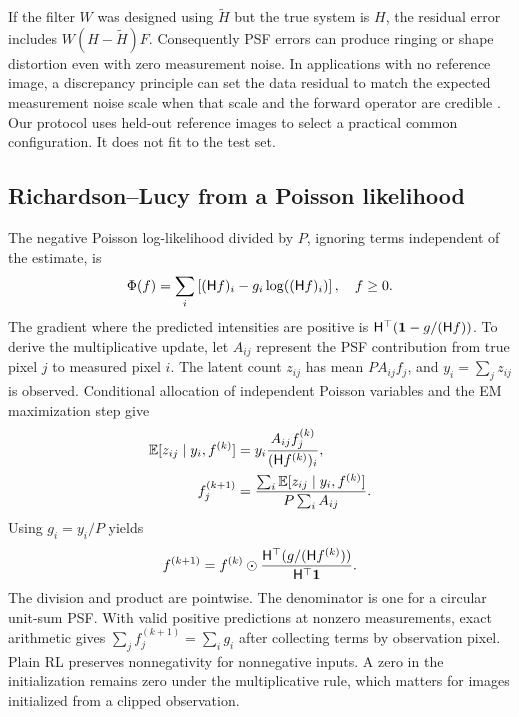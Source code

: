 If the filter \(W\) was designed using \(\widetilde H\) but the true system is \(H\), the residual error includes \(W(H-\widetilde H)F\). Consequently PSF errors can produce ringing or shape distortion even with zero measurement noise. In applications with no reference image, a discrepancy principle can set the data residual to match the expected measurement noise scale when that scale and the forward operator are credible \citep{fessler}. Our protocol uses held-out reference images to select a practical common configuration. It does not fit to the test set.

\subsection{Richardson--Lucy from a Poisson likelihood}

The negative Poisson log-likelihood divided by \(P\), ignoring terms independent of the estimate, is
\begin{equation}
\Phi(f)=\sum_i\left[(\mathsf H f)_i-g_i\log((\mathsf H f)_i)\right],
\quad f\ge0.
\end{equation}
The gradient where the predicted intensities are positive is
\(\mathsf H^\top(\mathbf 1-g/(\mathsf H f))\). To derive the multiplicative update, let \(A_{ij}\) represent the PSF contribution from true pixel \(j\) to measured pixel \(i\). The latent count \(z_{ij}\) has mean \(P A_{ij}f_j\), and \(y_i=\sum_j z_{ij}\) is observed. Conditional allocation of independent Poisson variables and the EM maximization step give
\begin{align}
\mathbb E[z_{ij}\mid y_i,f^{(k)}] &=
y_i\frac{A_{ij}f^{(k)}_j}{(\mathsf H f^{(k)})_i},\\
f^{(k+1)}_j &=
\frac{\sum_i\mathbb E[z_{ij}\mid y_i,f^{(k)}]}
{P\sum_i A_{ij}} .
\end{align}
Using \(g_i=y_i/P\) yields \citep{richardson,lucy,shepp}
\begin{equation}
f^{(k+1)}= f^{(k)}\odot
\frac{\mathsf H^\top(g/(\mathsf H f^{(k)}))}{\mathsf H^\top\mathbf 1}.
\label{eq:rl}
\end{equation}
The division and product are pointwise. The denominator is one for a circular unit-sum PSF. With valid positive predictions at nonzero measurements, exact arithmetic gives
\(\sum_j f_j^{(k+1)}=\sum_i g_i\)
after collecting terms by observation pixel. Plain RL preserves nonnegativity for nonnegative inputs. A zero in the initialization remains zero under the multiplicative rule, which matters for images initialized from a clipped observation.

